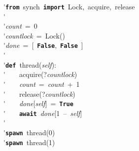 \'\>\texttt{\textbf{from}}~synch~\texttt{\textbf{import}}~Lock,~acquire,~release\\

\'\>\\

\'\>\textit{count}~=~0\\

\'\>\textit{countlock}~=~Lock()\\

\'\>\textit{done}~=~[~\texttt{\textbf{False}},~\texttt{\textbf{False}}~]\\

\'\>\\

\'\>\texttt{\textbf{def}}~thread(\textit{self}):\\

\'\>~~~~acquire(?\textit{countlock})\\

\'\>~~~~\textit{count}~=~\textit{count}~+~1\\

\'\>~~~~release(?\textit{countlock})\\

\'\>~~~~\textit{done}[\textit{self}]~=~\texttt{\textbf{True}}\\

\'\>~~~~\texttt{\textbf{await}}~\textit{done}[1~--~\textit{self}]\\

\'\>\\

\'\>\texttt{\textbf{spawn}}~thread(0)\\

\'\>\texttt{\textbf{spawn}}~thread(1)